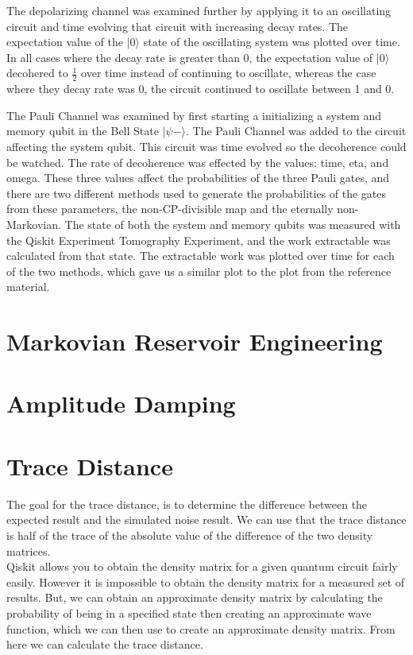 \documentclass[12pt]{article}
\begin{document}
The depolarizing channel was examined further by applying it to an oscillating circuit and time evolving that circuit with increasing decay rates. The expectation value of the $\vert 0 \rangle$ state of the oscillating system was plotted over time. In all cases where the decay rate is greater than 0, the expectation value of $\vert 0 \rangle$ decohered to $\frac{1}{2}$ over time instead of continuing to oscillate, whereas the case where they decay rate was 0, the circuit continued to oscillate between 1 and 0. 

The Pauli Channel was examined by first starting a initializing a system and memory qubit in the Bell State $\vert \psi - \rangle$. The Pauli Channel was added to the circuit affecting the system qubit. This circuit was time evolved so the decoherence could be watched. The rate of decoherence was effected by the values: time, eta, and omega. These three values affect the probabilities of the three Pauli gates, and there are two different methods used to generate the probabilities of the gates from these parameters, the non-CP-divisible map and the eternally non-Markovian. The state of both the system and memory qubits was measured with the Qiskit Experiment Tomography Experiment, and the work extractable was calculated from that state. The extractable work was plotted over time for each of the two methods, which gave us a similar plot to the plot from the reference material.

  \section{Markovian Reservoir Engineering}
  \blindtext

  \section{Amplitude Damping}
  \blindtext

\section{Trace Distance}
        The goal for the trace distance, is to determine the difference between the expected result and the simulated noise result. We can use that the trace distance is half of the trace of the absolute value of the difference of the two density matrices. \\
        Qiskit allows you to obtain the density matrix for a given quantum circuit fairly easily. However it is impossible to obtain the density matrix for a measured set of results. But, we can obtain an approximate density matrix by calculating the probability of being in a specified state then creating an approximate wave function, which we can then use to create an approximate density matrix. From here we can calculate the trace distance.  
\end{document}
